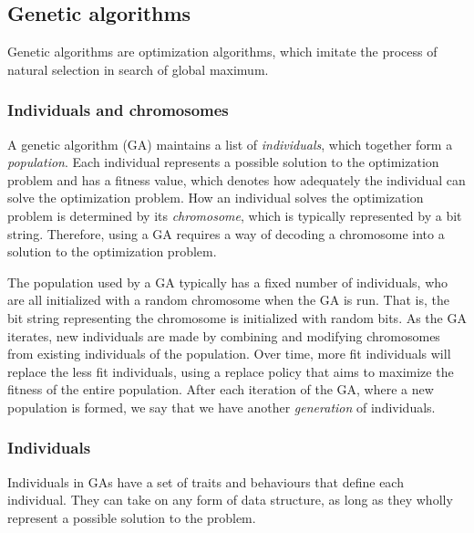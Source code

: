 \subsection{Genetic algorithms} 
Genetic algorithms are optimization algorithms, which imitate the process of natural selection in search of global maximum.

\subsubsection{Individuals and chromosomes}
A genetic algorithm (GA) maintains a list of \emph{individuals}, which together form a \emph{population}. Each individual represents a possible solution to the optimization problem and has a fitness value, which denotes how adequately the individual can solve the optimization problem. How an individual solves the optimization problem is determined by its \emph{chromosome}, which is typically represented by a bit string. Therefore, using a GA requires a way of decoding a chromosome into a solution to the optimization problem.

The population used by a GA typically has a fixed number of individuals, who are all initialized with a random chromosome when the GA is run. That is, the bit string representing the chromosome is initialized with random bits. As the GA iterates, new individuals are made by combining and modifying chromosomes from existing individuals of the population. Over time, more fit individuals will replace the less fit individuals, using a replace policy that aims to maximize the fitness of the entire population. After each iteration of the GA, where a new population is formed, we say that we have another \emph{generation} of individuals.

\subsubsection{Individuals}
Individuals in GAs have a set of traits and behaviours that define each individual. They can take on any form of data structure, as long as they wholly represent a possible solution to the problem. 


